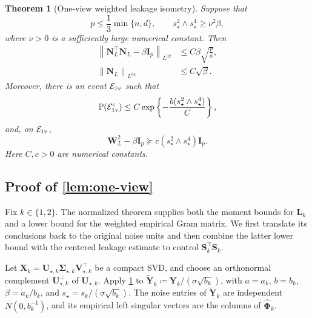 \documentclass[11pt]{article}
\newtheorem{theorem}{Theorem}
\newcommand{\Pp}{\mathbb{P}}
\newcommand{\trans}{\top}
\newcommand{\Lqn}[2]{\left\lVert #1\right\rVert_{L^{#2}}}
\newcommand{\cE}{\mathcal{E}}
\begin{document}
\begin{theorem}[One-view weighted leakage isometry]
\label{thm:one-view-isometry}
Suppose that
\[
  p\le\frac13\min\{n,d\},
  \qquad
  s_\star^2\wedge s_\star^4\ge\nu^2\beta,
\]
where $\nu>0$ is a sufficiently large numerical constant.  Then
\begin{subequations}
\label{eq:one-view-theorem-bounds}
\begin{align}
  \Lqn{
    \bm N_L^\trans\bm N_L-\beta\bm I_p
  }{32}
  &\le
  C\beta\sqrt{\frac pa},
  \label{eq:one-view-theorem-centered}
  \\
  \Lqn{\bm N_L}{64}
  &\le
  C\sqrt\beta.
  \label{eq:one-view-theorem-size}
\end{align}
\end{subequations}
Moreover, there is an event $\cE_{\rm 1v}$ such that
\begin{equation}
\label{eq:one-view-theorem-good-event-prob}
  \Pp(\cE_{\rm 1v}^c)
  \le
  C\exp\left\{
    -\frac{b(s_\star^2\wedge s_\star^4)}{C}
  \right\},
\end{equation}
and, on $\cE_{\rm 1v}$,
\begin{equation}
\label{eq:one-view-theorem-weight-floor}
  \bm W_L^2-\beta\bm I_p
  \succeq
  c(s_\star^2\wedge s_\star^4)\bm I_p.
\end{equation}
Here $C,c>0$ are numerical constants.
\end{theorem}


\subsection{Proof of \cref{lem:one-view}}


Fix $k\in\{1,2\}$.  The normalized theorem supplies both the moment bounds
for $\bm L_k$ and a lower bound for the weighted empirical Gram matrix.  We
first translate its conclusions back to the original noise units and then combine
the latter lower bound with the centered leakage estimate to control
$\bm S_k^\trans\bm S_k$.

Let
$\bm X_k=\bm U_{\star,k}\bm\Sigma_{\star,k}\bm V_{\star,k}^\trans$
be a compact SVD, and choose an orthonormal complement
$\bm U_{\star,k}^\perp$ of $\bm U_{\star,k}$.  Apply
\cref{thm:one-view-isometry} to
$\widetilde{\bm Y}_k\coloneqq
\bm Y_k/(\sigma\sqrt{b_k})$, with
$a=a_k$, $b=b_k$, $\beta=a_k/b_k$, and
$s_\star=s_k/(\sigma\sqrt{b_k})$.  The noise entries of
$\widetilde{\bm Y}_k$ are independent $N(0,b_k^{-1})$, and its empirical
left singular vectors are the columns of $\widehat{\bm\Phi}_k$.
\end{document}
